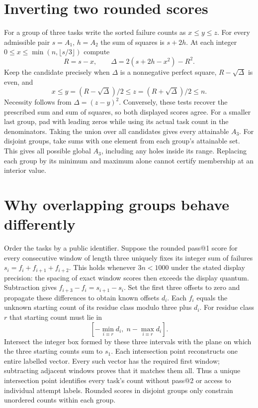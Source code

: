 \documentclass[11pt]{article}
\begin{document}
\newpage
\section{Inverting two rounded scores}
For a group of three tasks write the sorted failure counts as $x\le y\le z$. For every admissible pair $s=A_1$, $h=A_2$ the sum of squares is $s+2h$. At each integer $0\le x\le\min(n,\lfloor s/3\rfloor)$ compute
\[
        R=s-x,\qquad \Delta=2(s+2h-x^2)-R^2 .
\]
Keep the candidate precisely when $\Delta$ is a nonnegative perfect square, $R-\sqrt{\Delta}$ is even, and
\[
 x\le y=(R-\sqrt{\Delta})/2 \le z=(R+\sqrt{\Delta})/2\le n .
\]
Necessity follows from $\Delta=(z-y)^2$. Conversely, these tests recover the prescribed sum and sum of squares, so both displayed scores agree. For a smaller last group, pad with leading zeros while using its actual task count in the denominators. Taking the union over all candidates gives every attainable $A_3$. For disjoint groups, take sums with one element from each group's attainable set. This gives all possible global $A_3$, including any holes inside its range. Replacing each group by its minimum and maximum alone cannot certify membership at an interior value.

\section{Why overlapping groups behave differently}
Order the tasks by a public identifier. Suppose the rounded pass@1 score for every consecutive window of length three uniquely fixes its integer sum of failures $s_i=f_i+f_{i+1}+f_{i+2}$. This holds whenever $3n<1000$ under the stated display precision: the spacing of exact window scores then exceeds the display quantum. Subtraction gives $f_{i+3}-f_i=s_{i+1}-s_i$. Set the first three offsets to zero and propagate these differences to obtain known offsets $d_i$. Each $f_i$ equals the unknown starting count of its residue class modulo three plus $d_i$. For residue class $r$ that starting count must lie in
\[
 [-\min_{i\equiv r}d_i,\; n-\max_{i\equiv r}d_i].
\]
Intersect the integer box formed by these three intervals with the plane on which the three starting counts sum to $s_1$. Each intersection point reconstructs one entire labelled vector. Every such vector has the required first window; subtracting adjacent windows proves that it matches them all. Thus a unique intersection point identifies every task's count without pass@2 or access to individual attempt labels. Rounded scores in disjoint groups only constrain unordered counts within each group.
\end{document}
